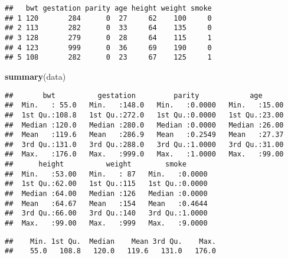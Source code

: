 \documentclass[
]{article}
\newenvironment{Shaded}{\begin{snugshade}}{\end{snugshade}}
\newcommand{\FunctionTok}[1]{\textcolor[rgb]{0.13,0.29,0.53}{\textbf{#1}}}
\newcommand{\NormalTok}[1]{#1}
\newcommand{\OtherTok}[1]{\textcolor[rgb]{0.56,0.35,0.01}{#1}}
\newcommand{\SpecialCharTok}[1]{\textcolor[rgb]{0.81,0.36,0.00}{\textbf{#1}}}
\begin{document}
\begin{verbatim}
##   bwt gestation parity age height weight smoke
## 1 120       284      0  27     62    100     0
## 2 113       282      0  33     64    135     0
## 3 128       279      0  28     64    115     1
## 4 123       999      0  36     69    190     0
## 5 108       282      0  23     67    125     1
\end{verbatim}

\begin{Shaded}
\begin{Highlighting}[]
\FunctionTok{summary}\NormalTok{(data)}
\end{Highlighting}
\end{Shaded}

\begin{verbatim}
##       bwt          gestation         parity            age       
##  Min.   : 55.0   Min.   :148.0   Min.   :0.0000   Min.   :15.00  
##  1st Qu.:108.8   1st Qu.:272.0   1st Qu.:0.0000   1st Qu.:23.00  
##  Median :120.0   Median :280.0   Median :0.0000   Median :26.00  
##  Mean   :119.6   Mean   :286.9   Mean   :0.2549   Mean   :27.37  
##  3rd Qu.:131.0   3rd Qu.:288.0   3rd Qu.:1.0000   3rd Qu.:31.00  
##  Max.   :176.0   Max.   :999.0   Max.   :1.0000   Max.   :99.00  
##      height          weight        smoke       
##  Min.   :53.00   Min.   : 87   Min.   :0.0000  
##  1st Qu.:62.00   1st Qu.:115   1st Qu.:0.0000  
##  Median :64.00   Median :126   Median :0.0000  
##  Mean   :64.67   Mean   :154   Mean   :0.4644  
##  3rd Qu.:66.00   3rd Qu.:140   3rd Qu.:1.0000  
##  Max.   :99.00   Max.   :999   Max.   :9.0000
\end{verbatim}

\begin{Shaded}
\end{Shaded}

\begin{verbatim}
##    Min. 1st Qu.  Median    Mean 3rd Qu.    Max. 
##    55.0   108.8   120.0   119.6   131.0   176.0
\end{verbatim}

\begin{Shaded}
\end{Shaded}
\end{document}
